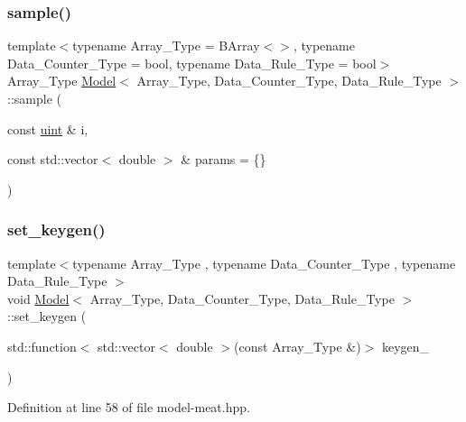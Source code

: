 \mbox{\label{class_model_a86484783c8091b509335fefd9f22d6ae}} 
\subsubsection{\texorpdfstring{sample()}{sample()}\hspace{0.1cm}{\footnotesize\ttfamily [2/2]}}
{\footnotesize\ttfamily template$<$typename Array\+\_\+\+Type  = B\+Array$<$$>$, typename Data\+\_\+\+Counter\+\_\+\+Type  = bool, typename Data\+\_\+\+Rule\+\_\+\+Type  = bool$>$ \\
Array\+\_\+\+Type \hyperlink{class_model}{Model}$<$ Array\+\_\+\+Type, Data\+\_\+\+Counter\+\_\+\+Type, Data\+\_\+\+Rule\+\_\+\+Type $>$\+::sample (\begin{DoxyParamCaption}\item[{const \hyperlink{typedefs_8hpp_a91ad9478d81a7aaf2593e8d9c3d06a14}{uint} \&}]{i,  }\item[{const std\+::vector$<$ double $>$ \&}]{params = {\ttfamily \{\}} }\end{DoxyParamCaption})}

\mbox{\label{class_model_add1847cdaf3f5bbde6c14efc2e4d16df}} 
\subsubsection{\texorpdfstring{set\+\_\+keygen()}{set\_keygen()}}
{\footnotesize\ttfamily template$<$typename Array\+\_\+\+Type , typename Data\+\_\+\+Counter\+\_\+\+Type , typename Data\+\_\+\+Rule\+\_\+\+Type $>$ \\
void \hyperlink{class_model}{Model}$<$ Array\+\_\+\+Type, Data\+\_\+\+Counter\+\_\+\+Type, Data\+\_\+\+Rule\+\_\+\+Type $>$\+::set\+\_\+keygen (\begin{DoxyParamCaption}\item[{std\+::function$<$ std\+::vector$<$ double $>$(const Array\+\_\+\+Type \&)$>$}]{keygen\+\_\+ }\end{DoxyParamCaption})\hspace{0.3cm}{\ttfamily [inline]}}



Definition at line 58 of file model-\/meat.\+hpp.

\mbox{\label{class_model_a06a6f52dfc6868908cf11e6663a93904}} 
